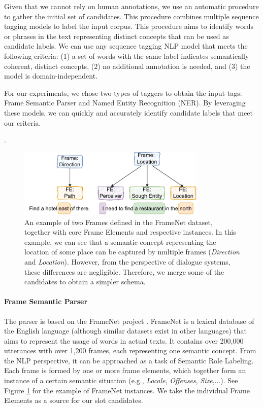 Given that we cannot rely on human annotations, we use an automatic procedure to gather the initial set of candidates.
This procedure combines multiple sequence tagging models to label the input corpus.
This procedure aims to identify words or phrases in the text representing distinct concepts that can be used as candidate labels.
We can use any sequence tagging NLP model that meets the following criteria: (1) a set of words with the same label indicates semantically coherent, distinct concepts, (2) no additional annotation is needed, and (3) the model is domain-independent.

For our experiments, we chose two types of taggers to obtain the input tags: Frame Semantic Parser and Named Entity Recognition (NER).
By leveraging these models, we can quickly and accurately identify candidate labels that meet our criteria.


.
\begin{figure}[h!]
\centering
    \includegraphics[width=0.8\textwidth]{images/framenet.pdf}
    \caption{An example of two Frames defined in the FrameNet dataset, together with core Frame Elements and respective instances. In this example, we can see that a semantic concept representing the location of some place can be captured by multiple frames (\emph{Direction} and \emph{Location}). However, from the perspective of dialogue systems, these differences are negligible. Therefore, we merge some of the candidates to obtain a simpler schema.}
    \label{fig:framenet}
\end{figure}

\paragraph{Frame Semantic Parser} The parser is based on the FrameNet project \cite{baker1998berkeley}.
FrameNet is a lexical database of the English language (although similar datasets exist in other languages) that aims to represent the usage of words in actual texts.
It contains over 200,000 utterances with over 1,200 frames, each representing one semantic concept.
From the NLP perspective, it can be approached as a task of Semantic Role Labeling.
Each frame is formed by one or more frame elements, which together form an instance of a certain semantic situation (e.g., \emph{Locale}, \emph{Offenses}, \emph{Size},...).
See Figure \ref{fig:framenet} for the example of FrameNet instances.
We take the individual Frame Elements as a source for our slot candidates.

